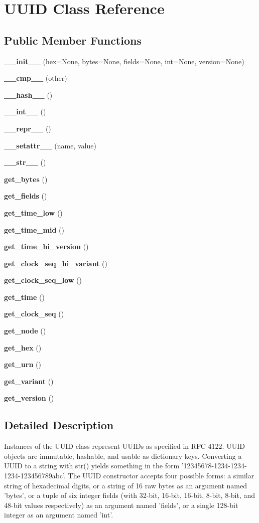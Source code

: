 \section{UUID Class Reference}
\label{classUUID}
\subsection*{Public Member Functions}
\begin{CompactItemize}
\item 
{\bf \_\-\_\-init\_\-\_\-} (hex=None, bytes=None, fields=None, int=None, version=None)
\item 
{\bf \_\-\_\-cmp\_\-\_\-} (other)
\item 
{\bf \_\-\_\-hash\_\-\_\-} ()
\item 
{\bf \_\-\_\-int\_\-\_\-} ()
\item 
{\bf \_\-\_\-repr\_\-\_\-} ()
\item 
{\bf \_\-\_\-setattr\_\-\_\-} (name, value)
\item 
{\bf \_\-\_\-str\_\-\_\-} ()
\item 
{\bf get\_\-bytes} ()
\item 
{\bf get\_\-fields} ()
\item 
{\bf get\_\-time\_\-low} ()
\item 
{\bf get\_\-time\_\-mid} ()
\item 
{\bf get\_\-time\_\-hi\_\-version} ()
\item 
{\bf get\_\-clock\_\-seq\_\-hi\_\-variant} ()
\item 
{\bf get\_\-clock\_\-seq\_\-low} ()
\item 
{\bf get\_\-time} ()
\item 
{\bf get\_\-clock\_\-seq} ()
\item 
{\bf get\_\-node} ()
\item 
{\bf get\_\-hex} ()
\item 
{\bf get\_\-urn} ()
\item 
{\bf get\_\-variant} ()
\item 
{\bf get\_\-version} ()
\end{CompactItemize}


\subsection{Detailed Description}
Instances of the UUID class represent UUIDs as specified in RFC 4122. UUID objects are immutable, hashable, and usable as dictionary keys. Converting a UUID to a string with str() yields something in the form '12345678-1234-1234-1234-123456789abc'. The UUID constructor accepts four possible forms: a similar string of hexadecimal digits, or a string of 16 raw bytes as an argument named 'bytes', or a tuple of six integer fields (with 32-bit, 16-bit, 16-bit, 8-bit, 8-bit, and 48-bit values respectively) as an argument named 'fields', or a single 128-bit integer as an argument named 'int'.


